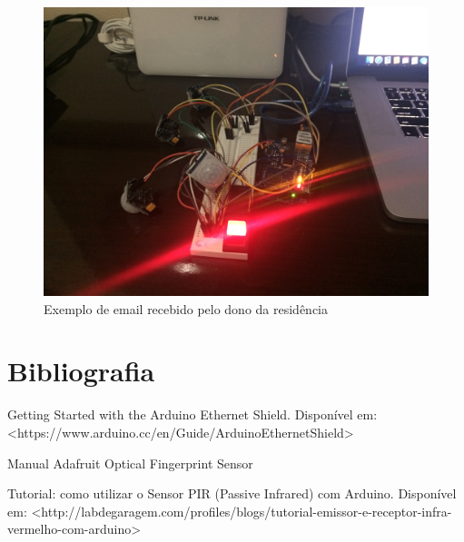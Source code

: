 \documentclass[13pt,a4]{article}
\begin{document}
\begin{figure}[!htb]
	\centering
	\includegraphics[scale=0.1]{final.jpg}
	\caption{Exemplo de email recebido pelo dono da residência}
	\label{}
\end{figure}

\section{Bibliografia}

Getting Started with the Arduino Ethernet Shield. Disponível em: <https://www.arduino.cc/en/Guide/ArduinoEthernetShield>
 
Manual Adafruit Optical Fingerprint Sensor

Tutorial: como utilizar o Sensor PIR (Passive Infrared) com Arduino. Disponível em: <http://labdegaragem.com/profiles/blogs/tutorial-emissor-e-receptor-infra-vermelho-com-arduino>
   
\end{document}
